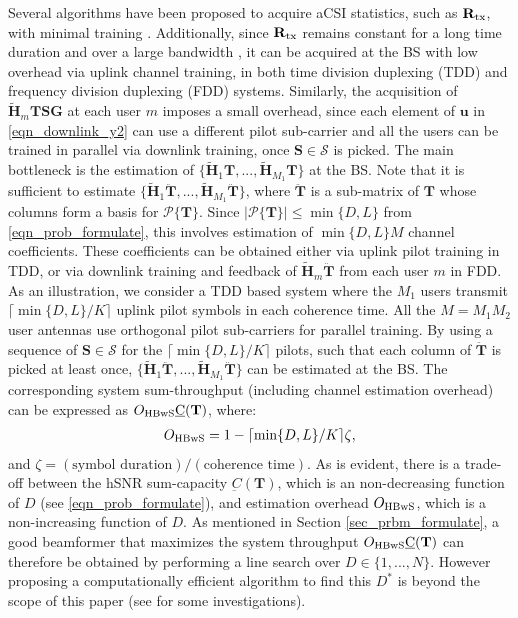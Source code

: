 \documentclass[journal,comsoc]{IEEEtran}
\begin{document}
Several algorithms have been proposed to acquire aCSI statistics, such as $\mathbf{R}_{\rm tx}$, with minimal training \cite{Caire2017, Park2016}. Additionally, since $\mathbf{R}_{\rm tx}$ remains constant for a long time duration and over a large bandwidth \cite{ispas2015analysis, wang2017stationarity}, it can be acquired at the BS with low overhead via uplink channel training, in both time division duplexing (TDD) and frequency division duplexing (FDD) systems.
%
Similarly, the acquisition of $\widetilde{\mathbf{H}}_{m} \mathbf{T} \mathbf{S} \mathbf{G}$ at each user $m$ imposes a small overhead, since each element of $\mathbf{u}$ in \eqref{eqn_downlink_y2} can use a different pilot sub-carrier and all the users can be trained in parallel via downlink training, once $\mathbf{S} \in \mathcal{S}$ is picked. 
%
The main bottleneck is the estimation of $\{\widetilde{\mathbf{H}}_{1} \mathbf{T}, ..., \widetilde{\mathbf{H}}_{M_1} \mathbf{T}\}$ at the BS. Note that it is sufficient to estimate $\{\widetilde{\mathbf{H}}_{1} \ddot{\mathbf{T}}, ..., \widetilde{\mathbf{H}}_{M_1} \ddot{\mathbf{T}}\}$, where $\ddot{\mathbf{T}}$ is a sub-matrix of $\mathbf{T}$ whose columns form a basis for $\mathcal{P}\{\mathbf{T}\}$. Since $|\mathcal{P}\{\mathbf{T}\}| \leq \min\{D,L\}$ from \eqref{eqn_prob_formulate}, this involves estimation of $\min\{D,L\} M$ channel coefficients. These coefficients can be obtained either via uplink pilot training in TDD, or via downlink training and feedback of $\widetilde{\mathbf{H}}_{m} \ddot{\mathbf{T}}$ from each user $m$ in FDD. 
As an illustration, we consider a TDD based system where the $M_1$ users transmit $\lceil \min\{D,L\}/K \rceil$ uplink pilot symbols in each coherence time. All the $M = M_1 M_2$ user antennas use orthogonal pilot sub-carriers for parallel training. By using a sequence of $\mathbf{S} \in \mathcal{S}$ for the $\lceil \min\{D,L\}/K \rceil$ pilots, such that each column of $\ddot{\mathbf{T}}$ is picked at least once, $\{\widetilde{\mathbf{H}}_{1} \ddot{\mathbf{T}}, ..., \widetilde{\mathbf{H}}_{M_1} \ddot{\mathbf{T}}\}$ can be estimated at the BS. The corresponding system sum-throughput (including channel estimation overhead) can be expressed as $O_{\rm HBwS}\underbar{C}(\mathbf{T})$, where: 
\begin{eqnarray} \label{eqn_chan_est_overhead}
O_{\rm HBwS} = 1 - \lceil \min\{D,L\}/K \rceil \zeta,
\end{eqnarray}
and $\zeta=(\text{symbol duration})\big/ (\text{coherence time})$. 
As is evident, there is a trade-off between the hSNR sum-capacity $\underbar{C}(\mathbf{T})$, which is an non-decreasing function of $D$ (see \eqref{eqn_prob_formulate}), and estimation overhead $O_{\rm HBwS}$, which is a non-increasing function of $D$. As mentioned in Section \ref{sec_prbm_formulate}, a good beamformer that maximizes the system throughput $O_{\rm HBwS}\underbar{C}(\mathbf{T})$ can therefore be obtained by performing a line search over $D \in \{1,...,N\}$. However proposing a computationally efficient algorithm to find this $D^{*}$ is beyond the scope of this paper (see \cite{Vishnu_Globecom, Gao2018} for some investigations). 
%
%
\end{document}

